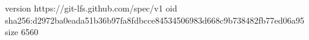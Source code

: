 version https://git-lfs.github.com/spec/v1
oid sha256:d2972ba0eada51b36b97fa8fdbcce84534506983d668c9b738482fb77ed06a95
size 6560
